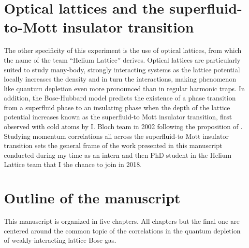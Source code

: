 \section*{Optical lattices and the superfluid-to-Mott insulator transition}

The other specificity of this experiment is the use of optical lattices, from which the name of the team ``Helium Lattice'' derives. Optical lattices are particularly suited to study many-body, strongly interacting systems as the lattice potential locally increases the density and in turn the interactions, making phenomenon like quantum depletion even more pronounced than in regular harmonic traps. In addition, the Bose-Hubbard model predicts the existence of a phase transition from a superfluid phase to an insulating phase when the depth of the lattice potential increases known as the superfluid-to Mott insulator transition, first observed with cold atoms by I. Bloch team in 2002 \cite{greiner2002quantum} following the proposition of \cite{jaksch1998cold}. Studying momentum correlations all across the superfluid-to Mott insulator transition sets the general frame of the work presented in this manuscript conducted during my time as an intern and then PhD student in the Helium Lattice team that I the chance to join in 2018.

\section*{Outline of the manuscript}

This manuscript is organized in five chapters. All chapters but the final one are centered around the common topic of the \kmk correlations in the quantum depletion of weakly-interacting lattice Bose gas.

